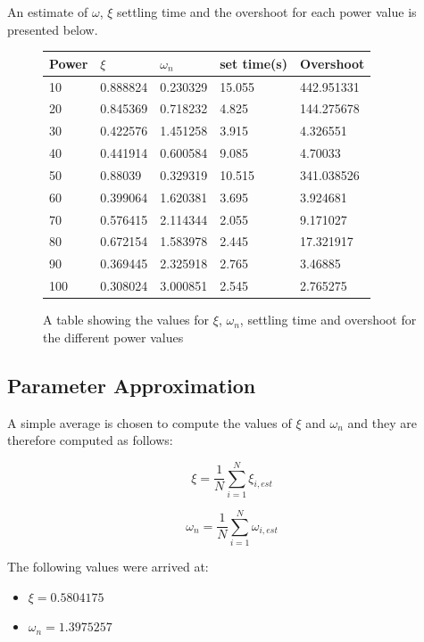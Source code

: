 An estimate of $\omega$, $\xi$ settling time and the overshoot for each power value is presented below.
\newline 
\begin{figure}[H]
\begin{center}
	\begin{tabular}{ |l | l | l | l| l | }
		\hline
		Power & $\xi$ & $\omega _n$ & set time(s) & Overshoot \\
        \hline
        10 & 0.888824 & 0.230329 & 15.055 & 442.951331 \\
        \hline
        20 & 0.845369 & 0.718232 & 4.825 & 144.275678 \\
        \hline
        30 & 0.422576 & 1.451258 & 3.915 & 4.326551 \\
        \hline
        40 & 0.441914 & 0.600584 & 9.085 & 4.70033 \\
        \hline
        50 & 0.88039 & 0.329319 & 10.515 & 341.038526 \\
        \hline
        60 & 0.399064 & 1.620381 & 3.695 & 3.924681 \\
        \hline
        70 & 0.576415 & 2.114344 & 2.055 & 9.171027 \\
        \hline
        80 & 0.672154 & 1.583978 & 2.445 & 17.321917 \\
        \hline
        90 & 0.369445 & 2.325918 & 2.765 & 3.46885 \\
        \hline
        100 & 0.308024 & 3.000851 & 2.545 & 2.765275 \\
        \hline
        
	\end{tabular}
    
\end{center}
\caption{A table showing the values for $\xi$, $\omega _n$, settling time and overshoot for the different power values}
 \end{figure}

\subsection{Parameter Approximation}
\label{sec:parApprox}
A simple average is chosen to compute the values of $\xi$ and $\omega _n$ and they are therefore computed as follows:

\begin{equation} 
    \xi = \frac{1}{N}\sum _{i=1}^{N}\xi _{i,est} 
\end{equation}

\begin{equation} 
    \omega _n = \frac{1}{N}\sum _{i=1}^{N}\omega _{i,est} 
\end{equation}

The following values were arrived at:
\begin{itemize}
 	\item $\xi=0.5804175$
    \item $\omega _n=1.3975257$
\end{itemize}


























